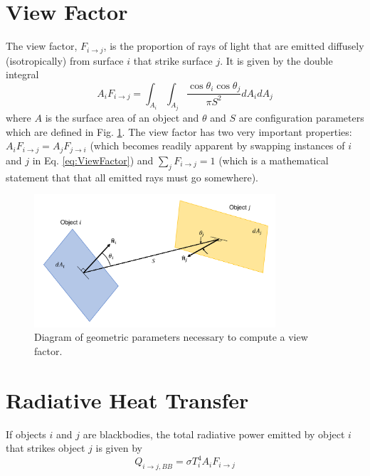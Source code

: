 \section{View Factor}
%
The view factor, $F_{i \rightarrow  j}$, is the proportion of rays of light that are emitted diffusely (isotropically) from surface $i$ that strike surface $j$. It is given by the double integral
%
\begin{equation}\label{eq:ViewFactor}
	A_{i} F_{i \rightarrow j} = \int_{A_{i}} \int_{A_{j}} \frac{ \cos{\theta_{i}} \cos{\theta_{j}} }{ \pi S^{2} } dA_{i}dA_{j}
\end{equation}
%
where $A$ is the surface area of an object and $\theta$ and $S$ are configuration parameters which are defined in Fig. \ref{fig:ViewFactor}. The view factor has two very important properties: $A_{i} F_{i \rightarrow  j} = A_{j} F_{j \rightarrow i}$ (which becomes readily apparent by swapping instances of $i$ and $j$ in Eq. \ref{eq:ViewFactor}) and $\sum_{j} F_{i \rightarrow  j} = 1$ (which is a mathematical statement that that all emitted rays must go somewhere).

\begin{figure}
\centering
\includegraphics[width=0.8\textwidth]{./Figures/ViewFactor.pdf}
\caption{\label{fig:ViewFactor}Diagram of geometric parameters necessary to compute a view factor.}
\end{figure}


\section{Radiative Heat Transfer}
%
If objects $i$ and $j$ are blackbodies, the total radiative power emitted by object $i$ that strikes object $j$  is given by
%
\begin{equation} \label{eq:RadiatedPower}
Q_{i \rightarrow j, BB} = \sigma T_{i}^{4} A_{i} F_{i \rightarrow j}
\end{equation}

